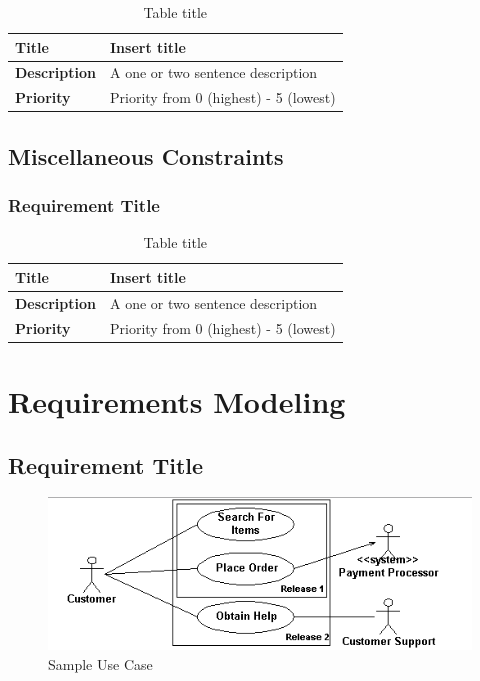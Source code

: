 \documentclass{article}
\begin{document}
\begin{table}[H]
\caption{Table title}
\begin{tabularx}{\textwidth}{|l|X|}
    \hline
    \textbf{Title} & Insert title \\ \hline
    \textbf{Description} &  A one or two sentence description \\ \hline 
    \textbf{Priority} &  Priority from 0 (highest) - 5 (lowest) \\ \hline       
\end{tabularx}
\end{table}

\subsection{Miscellaneous Constraints}

\subsubsection{Requirement Title}

\begin{table}[H]
\caption{Table title}
\begin{tabularx}{\textwidth}{|l|X|}
    \hline
    \textbf{Title} & Insert title \\ \hline
    \textbf{Description} &  A one or two sentence description \\ \hline 
    \textbf{Priority} &  Priority from 0 (highest) - 5 (lowest) \\ \hline       
\end{tabularx}
\end{table}

\clearpage

\section{Requirements Modeling}

\subsection{Requirement Title}

\begin{figure}[H]
  \begin{center}
    \caption{Sample Use Case}
    \includegraphics{images/sample_use_case.png}
  \end{center}
\end{figure}
\end{document}

